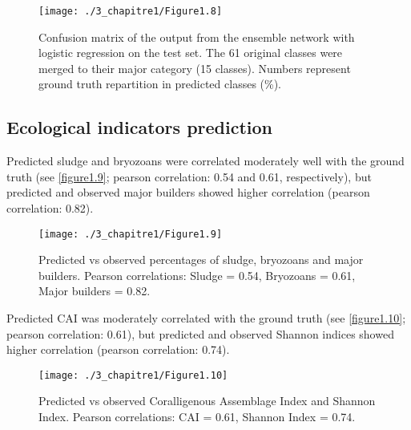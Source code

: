 \begin{figure}[H]
	\begin{center}
	\texttt{[image: ./3\_chapitre1/Figure1.8]}
		\caption[Confusion matrix of the output from the ensemble network with logistic regression on the test set]{Confusion matrix of the output from the ensemble network with logistic regression on the test set. The 61 original classes were merged to their major category (15 classes). Numbers represent ground truth repartition in predicted classes (\%).}
	\label{figure1.8}
\end{center}
\end{figure}

\newpage

\subsection{Ecological indicators prediction}\label{chapitre1_6.4}
Predicted sludge and bryozoans were correlated moderately well with the ground truth (see \autoref{figure1.9}; pearson correlation: 0.54 and 0.61, respectively), but predicted and observed major builders showed higher correlation (pearson correlation: 0.82).

\begin{figure}[H]
	\begin{center}
	\texttt{[image: ./3\_chapitre1/Figure1.9]}
		\caption[Predicted vs observed percentages of sludge, bryozoans and major builders]{Predicted vs observed percentages of sludge, bryozoans and major builders. Pearson correlations: Sludge = 0.54, Bryozoans = 0.61, Major builders = 0.82.}
	\label{figure1.9}
\end{center}
\end{figure}

Predicted CAI was moderately correlated with the ground truth (see \autoref{figure1.10}; pearson correlation: 0.61), but predicted and observed Shannon indices showed higher correlation (pearson correlation: 0.74).

\begin{figure}[H]
	\begin{center}
	\texttt{[image: ./3\_chapitre1/Figure1.10]}
		\caption[Predicted vs observed Coralligenous Assemblage Index and Shannon Index]{Predicted vs observed Coralligenous Assemblage Index and Shannon Index. Pearson correlations: CAI = 0.61, Shannon Index = 0.74.}
	\label{figure1.10}
\end{center}
\end{figure}

